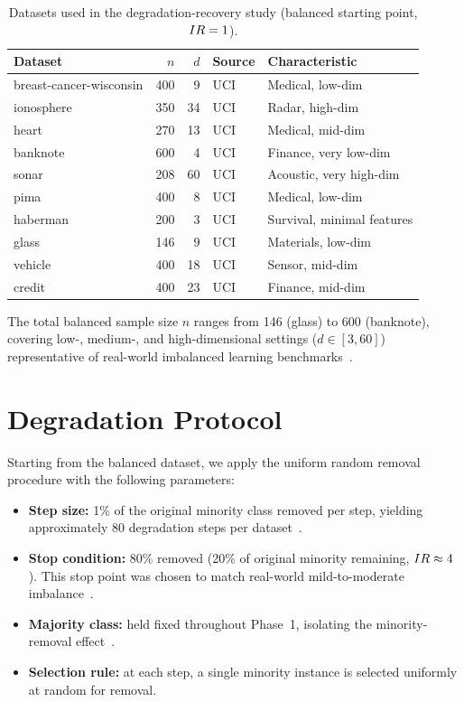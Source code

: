 \begin{table}[H]
\centering
\caption{Datasets used in the degradation-recovery study (balanced starting point, $IR = 1$).}
\label{tab:causal:datasets}
\begin{tabular}{lrrll}
\toprule
\textbf{Dataset} & \textbf{$n$} & \textbf{$d$} & \textbf{Source} & \textbf{Characteristic} \\
\midrule
breast-cancer-wisconsin & 400 &  9 & UCI & Medical, low-dim \\
ionosphere              & 350 & 34 & UCI & Radar, high-dim \\
heart                   & 270 & 13 & UCI & Medical, mid-dim \\
banknote                & 600 &  4 & UCI & Finance, very low-dim \\
sonar                   & 208 & 60 & UCI & Acoustic, very high-dim \\
pima                    & 400 &  8 & UCI & Medical, low-dim \\
haberman                & 200 &  3 & UCI & Survival, minimal features \\
glass                   & 146 &  9 & UCI & Materials, low-dim \\
vehicle                 & 400 & 18 & UCI & Sensor, mid-dim \\
credit                  & 400 & 23 & UCI & Finance, mid-dim \\
\bottomrule
\end{tabular}
\end{table}

The total balanced sample size $n$ ranges from 146 (glass) to 600 (banknote), covering low-, medium-, and high-dimensional settings ($d \in [3, 60]$) representative of real-world imbalanced learning benchmarks~\cite{fernandez2018learning, krawczyk2016learning}.


\section{Degradation Protocol}
\label{sec:setup_causal:degradation}

Starting from the balanced dataset, we apply the uniform random removal procedure with the following parameters:

\begin{itemize}[leftmargin=*]
    \item \textbf{Step size:} 1\% of the original minority class removed per step, yielding approximately 80 degradation steps per dataset~\cite{weiss2003effect}.
    \item \textbf{Stop condition:} 80\% removed (20\% of original minority remaining, $IR \approx 4$).
    This stop point was chosen to match real-world mild-to-moderate imbalance~\cite{he2009learning}.
    \item \textbf{Majority class:} held fixed throughout Phase~1, isolating the minority-removal effect~\cite{japkowicz2002class}.
    \item \textbf{Selection rule:} at each step, a single minority instance is selected uniformly at random for removal.
\end{itemize}

